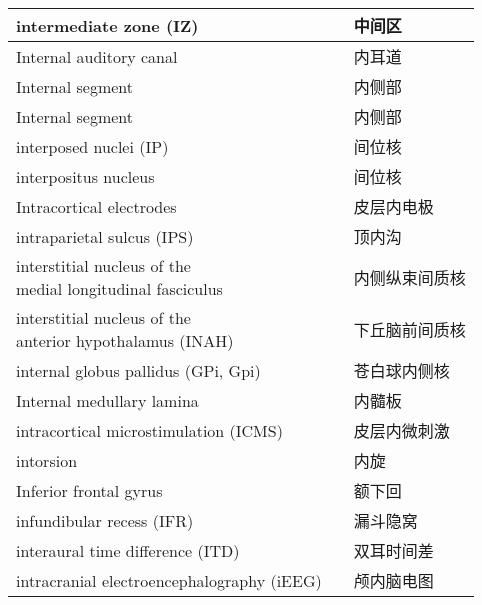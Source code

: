\begin{longtable}{lll}
	\midrule
	intermediate zone (IZ)  && 中间区  \\
	
	\midrule
	Internal auditory canal   && 内耳道  \\
	
	\midrule
	Internal segment  && 内侧部  \\
	
	\midrule
	Internal segment  && 内侧部  \\
	
	\midrule
	interposed nuclei (IP)  && 间位核  \\
	
	\midrule
	interpositus nucleus  && 间位核  \\
	
	\midrule
	Intracortical electrodes   && 皮层内电极  \\
	
	\midrule
	intraparietal sulcus (IPS)   && 顶内沟  \\
	
	\midrule
	\makecell{interstitial nucleus of the \\medial longitudinal fasciculus}   && 内侧纵束间质核  \\
	
	\midrule
	\makecell{interstitial nucleus of the \\anterior hypothalamus  (INAH)} && 下丘脑前间质核  \\
	
	\midrule
	internal globus pallidus (GPi, Gpi)  && 苍白球内侧核  \\
	
	\midrule
	Internal medullary lamina  && 内髓板  \\
	
	\midrule
	intracortical microstimulation (ICMS)  && 皮层内微刺激  \\
	
	\midrule
	intorsion   && 内旋  \\
	
	\midrule
	Inferior frontal gyrus   && 额下回  \\
	
	\midrule
	infundibular recess (IFR)   && 漏斗隐窝  \\
	
	\midrule
	interaural time difference (ITD)   && 双耳时间差  \\
	
	\midrule
	intracranial electroencephalography (iEEG)  && 颅内脑电图  \\
	

\end{longtable}
